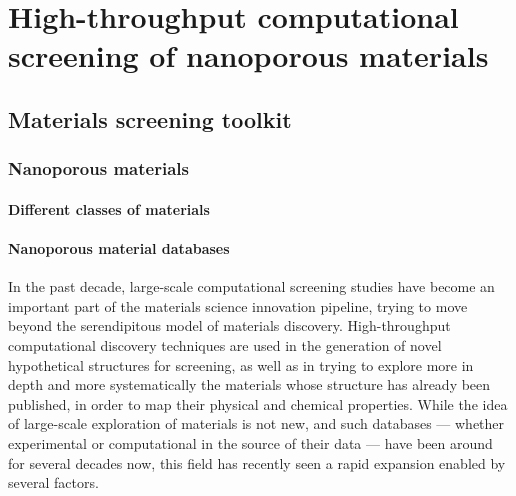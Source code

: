 \documentclass[main.tex]{subfiles}
\begin{document}
\chapter{High-throughput computational screening of nanoporous materials}
\vspace*{-1\baselineskip}


\section{Materials screening toolkit}

\subsection{Nanoporous materials}

\subsubsection{Different classes of materials}



\subsubsection{Nanoporous material databases}


In the past decade, large-scale computational screening studies have become an important part of the materials science innovation pipeline,\cite{Hautier_2019, Cole_2020} trying to move beyond the serendipitous model of materials discovery.\cite{Ludwig_2019, Stein_2019} High-throughput computational discovery techniques are used in the generation of novel hypothetical structures for screening,\cite{Wilmer_2012, Boyd_2016} as well as in trying to explore more in depth and more systematically the materials whose structure has already been published, in order to map their physical and chemical properties.\cite{GomezGualdron_2014,Moliner_2019,SalcedoPerez_2019} While the idea of large-scale exploration of materials is not new, and such databases --- whether experimental or computational in the source of their data --- have been around for several decades now,\cite{PDB_1971, Grazulis_2009, Groom_2016} this field has recently seen a rapid expansion enabled by several factors. 
\end{document}
